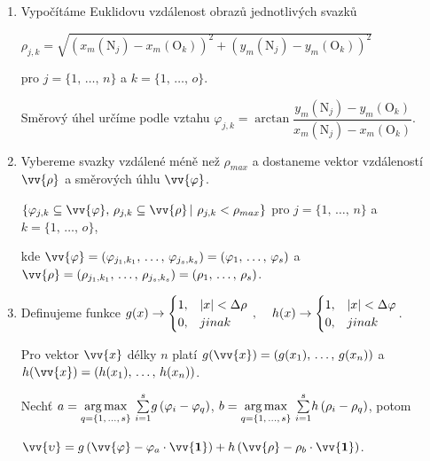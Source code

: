 \begin{enumerate}
\item Vypočítáme Euklidovu vzdálenost obrazů jednotlivých svazků

$\rho_{j,k} = \sqrt{\left( x_m(\mathrm{N}_j) - x_m(\mathrm{O}_k) \right)^2 + \left( y_m(\mathrm{N}_j) - y_m(\mathrm{O}_k) \right)^2}$ 

pro $j = \lbrace 1,\,\dots,\,n \rbrace$ a $k = \lbrace 1,\,\dots,\,o \rbrace$. 

Směrový úhel určíme podle vztahu $\varphi_{j,k} = \arctan\dfrac{y_m(\mathrm{N}_j) - y_m(\mathrm{O}_k)}{x_m(\mathrm{N}_j) - x_m(\mathrm{O}_k)}$.

\item Vybereme svazky vzdálené méně než $\rho_{max}$ a dostaneme vektor vzdáleností $\vv{\rho}$ a směrových úhlu $\vv{\varphi}$.

$\lbrace \varphi_{j,k} \subseteq \vv{\varphi},\,\rho_{j,k} \subseteq \vv{\rho}\,|\,\, \rho_{j,k} < \rho_{max} \rbrace$ pro $j = \lbrace 1,\,\dots,\,n \rbrace$ a $k = \lbrace 1,\,\dots,\,o \rbrace$,
 
 kde  $\vv{\varphi} = (\varphi_{{j_1},{k_1}},\,\dots,\,\varphi_{{j_s},{k_s}}) = (\varphi_{1},\,\dots,\,\varphi_{s})$ a $\vv{\rho} = (\rho_{{j_1},{k_1}},\,\dots,\,\rho_{{j_s},{k_s}}) = (\rho_{1},\,\dots,\,\rho_{s})$. 

\item Definujeme funkce $g(x)\rightarrow \begin{cases}
1, & |x| < \Delta\rho\\
0, & jinak
\end{cases}\,, \hspace{4mm}h(x) \rightarrow \begin{cases}
1, & |x| < \Delta\varphi\\
0, & jinak
\end{cases}$. 

Pro vektor $\vv{x}$ délky $n$ platí $g(\vv{x}) = \left(g(x_1),\,\dots,\,g(x_n)\right)$ a $h(\vv{x}) = \left(h(x_1),\,\dots,\,h(x_n)\right)$.

 Nechť $a = \underset{{q = \lbrace1,\,\dots,\,s\rbrace}}{\operatorname*{arg\,max}}\,\, \overset{s}{\underset{{i = 1}}{\sum}} g\left(\varphi_i-\varphi_q\right)$, \hspace{4mm} $b = \underset{{q = \lbrace1,\,\dots,\,s\rbrace}}{\operatorname*{arg\,max}}\,\, \overset{s}{\underset{{i = 1}}{\sum}} h\left(\rho_i-\rho_q\right)$, potom 

$\vv{\upsilon} = g\left(\vv{\varphi} - \varphi_a\cdot\vv{\mathbf{1}} \right) + h\left(\vv{\rho} - \rho_b\cdot\vv{\mathbf{1}} \right)$.



\end{enumerate}
